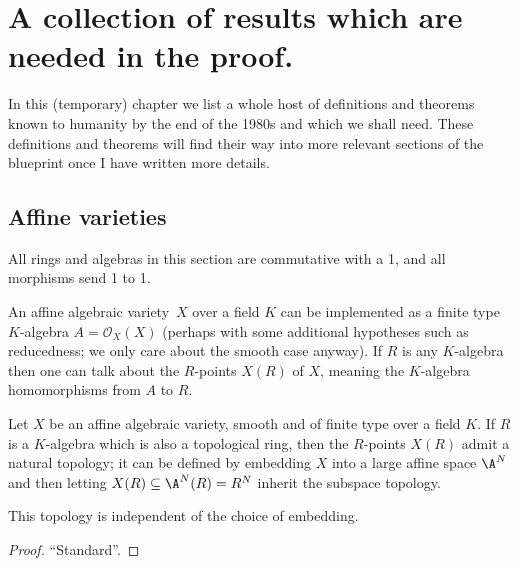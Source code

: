 \chapter{A collection of results which are needed in the proof.}

In this (temporary) chapter we list a whole host of definitions and theorems known to humanity by the end of the 1980s and which we shall need. These definitions and theorems will find their way into more relevant sections of the blueprint once I have written more details.

\section{Affine varieties}

All rings and algebras in this section are commutative with a 1, and all morphisms send 1 to 1.

An affine algebraic variety~$X$ over a field $K$ can be implemented as a finite type $K$-algebra $A=\mathcal{O}_X(X)$ (perhaps with some additional hypotheses such as reducedness; we only care about the smooth case anyway). If $R$ is any $K$-algebra then one can talk about the $R$-points $X(R)$ of $X$, meaning the $K$-algebra homomorphisms from $A$ to $R$.

\begin{definition}\label{topology_on_affine_variety_points} Let $X$ be an affine algebraic variety, smooth and of finite type over a field $K$. If $R$ is a $K$-algebra which is also a topological ring, then the $R$-points $X(R)$ admit a natural topology; it can be defined by embedding $X$ into a large affine space $\A^N$ and then letting $X(R)\subseteq\A^N(R)=R^N$ inherit the subspace topology.
\end{definition}

\begin{theorem}\label{topology_on_affine_variety_well_defined} This topology is independent of the choice of embedding.
\end{theorem}
\begin{proof} ``Standard''.
    


\end{proof}

